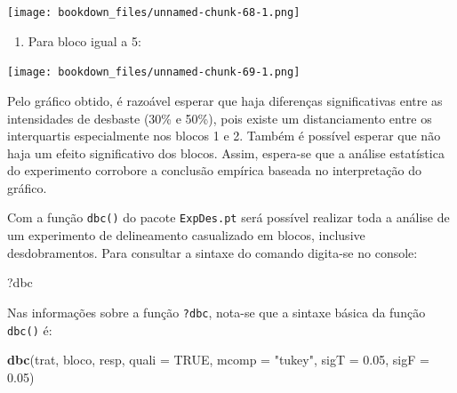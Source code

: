 \documentclass[
]{article}
\newenvironment{Shaded}{\begin{snugshade}}{\end{snugshade}}
\newcommand{\DataTypeTok}[1]{\textcolor[rgb]{0.13,0.29,0.53}{#1}}
\newcommand{\DecValTok}[1]{\textcolor[rgb]{0.00,0.00,0.81}{#1}}
\newcommand{\FloatTok}[1]{\textcolor[rgb]{0.00,0.00,0.81}{#1}}
\newcommand{\KeywordTok}[1]{\textcolor[rgb]{0.13,0.29,0.53}{\textbf{#1}}}
\newcommand{\NormalTok}[1]{#1}
\newcommand{\OperatorTok}[1]{\textcolor[rgb]{0.81,0.36,0.00}{\textbf{#1}}}
\newcommand{\OtherTok}[1]{\textcolor[rgb]{0.56,0.35,0.01}{#1}}
\newcommand{\StringTok}[1]{\textcolor[rgb]{0.31,0.60,0.02}{#1}}
\providecommand{\tightlist}{%
  \setlength{\itemsep}{0pt}\setlength{\parskip}{0pt}}
\begin{document}
\texttt{[image: bookdown\_files/unnamed-chunk-68-1.png]}

\begin{enumerate}
\def\labelenumi{\arabic{enumi}.}
\setcounter{enumi}{4}
\tightlist
\item
  Para bloco igual a 5:
\end{enumerate}

\begin{Shaded}
\end{Shaded}

\texttt{[image: bookdown\_files/unnamed-chunk-69-1.png]}

Pelo gráfico obtido, é razoável esperar que haja diferenças significativas entre as intensidades de desbaste (30\% e 50\%), pois existe um distanciamento entre os interquartis especialmente nos blocos 1 e 2. Também é possível esperar que não haja um efeito significativo dos blocos. Assim, espera-se que a análise estatística do experimento corrobore a conclusão empírica baseada no interpretação do gráfico.

Com a função \texttt{dbc()} do pacote \texttt{ExpDes.pt} será possível realizar toda a análise de um experimento de delineamento casualizado em blocos, inclusive desdobramentos. Para consultar a sintaxe do comando digita-se no console:

\begin{Shaded}
\begin{Highlighting}[]
\NormalTok{?dbc}
\end{Highlighting}
\end{Shaded}

Nas informações sobre a função \texttt{?dbc}, nota-se que a sintaxe básica da função \texttt{dbc()} é:

\begin{Shaded}
\begin{Highlighting}[]
\KeywordTok{dbc}\NormalTok{(trat, bloco, resp, }\DataTypeTok{quali =} \OtherTok{TRUE}\NormalTok{, }\DataTypeTok{mcomp =} \StringTok{"tukey"}\NormalTok{, }
    \DataTypeTok{sigT =} \FloatTok{0.05}\NormalTok{, }\DataTypeTok{sigF =} \FloatTok{0.05}\NormalTok{)}
\end{Highlighting}
\end{Shaded}
\end{document}

